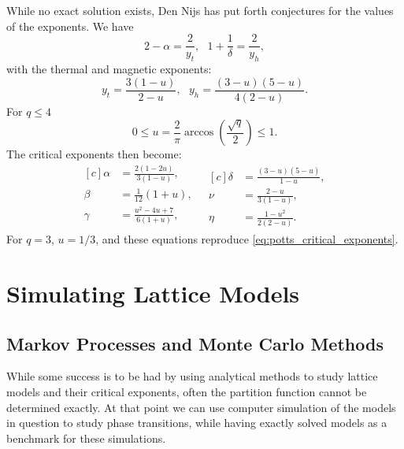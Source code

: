 \documentclass[11pt, a4paper]{report} %
\begin{document}
While no exact solution exists, Den Nijs has put forth conjectures for the values of the exponents.\cite{nijs:1979}
We have\cite{wu:1982}
\begin{equation}
	2 - \alpha = \frac{2}{y_t} ,\ \ \ 1 + \frac{1}{\delta} = \frac{2}{y_h},
\end{equation}
with the thermal and magnetic exponents:
\begin{equation}
	y_t = \frac{3(1-u)}{2-u},\ \ \ y_h = \frac{(3-u)(5-u)}{4(2-u)}.
\end{equation}
For \(q \leq 4\)\cite{wu:1982}
\begin{equation}
	0 \leq u = \frac{2}{\pi} \arccos(\frac{\sqrt{q}}{2}) \leq 1.
\end{equation}
The critical exponents then become\cite{wu:1982, baxter:1989}:
\begin{equation}
	\begin{aligned}[c]
		\alpha &= \frac{2(1-2u)}{3(1-u)}, \\
		\beta &= \frac{1}{12}(1 + u), \\
		\gamma &= \frac{u^2 -4u +7}{6(1+u)}, \\
	\end{aligned}
	\ \ \
	\begin{aligned}[c]
		\delta &= \frac{(3-u)(5-u)}{1-u}, \\
		\nu &= \frac{2-u}{3(1-u)}, \\
		\eta &= \frac{1-u^2}{2(2-u)}.
	\end{aligned}
\end{equation}
For \(q=3\), \(u=1/3\), and these equations reproduce \cref{eq:potts_critical_exponents}.


\chapter{Simulating Lattice Models}

\section{Markov Processes and Monte Carlo Methods}
While some success is to be had by using analytical methods to study lattice models and their critical exponents, often the partition function cannot be determined exactly.
At that point we can use computer simulation of the models in question to study phase transitions, while having exactly solved models as a benchmark for these simulations.
\end{document}
